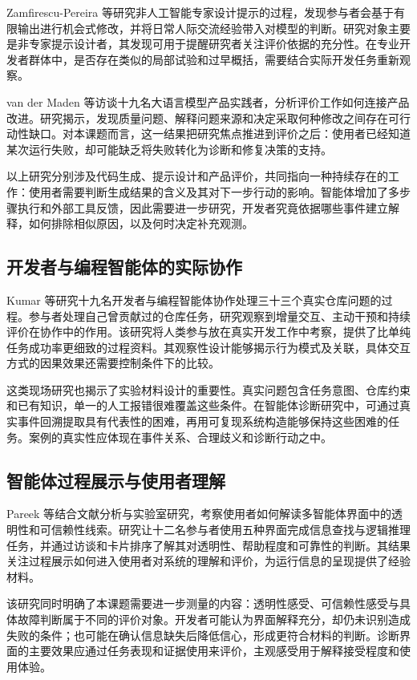 Zamfirescu-Pereira 等\cite{ref65}研究非人工智能专家设计提示的过程，发现参与者会基于有限输出进行机会式修改，并将日常人际交流经验带入对模型的判断。研究对象主要是非专家提示设计者，其发现可用于提醒研究者关注评价依据的充分性。在专业开发者群体中，是否存在类似的局部试验和过早概括，需要结合实际开发任务重新观察。

van der Maden 等\cite{ref01}访谈十九名大语言模型产品实践者，分析评价工作如何连接产品改进。研究揭示，发现质量问题、解释问题来源和决定采取何种修改之间存在可行动性缺口。对本课题而言，这一结果把研究焦点推进到评价之后：使用者已经知道某次运行失败，却可能缺乏将失败转化为诊断和修复决策的支持。

以上研究分别涉及代码生成、提示设计和产品评价，共同指向一种持续存在的工作：使用者需要判断生成结果的含义及其对下一步行动的影响。智能体增加了多步骤执行和外部工具反馈，因此需要进一步研究，开发者究竟依据哪些事件建立解释，如何排除相似原因，以及何时决定补充观测。

\subsection{开发者与编程智能体的实际协作}

Kumar 等\cite{ref59}研究十九名开发者与编程智能体协作处理三十三个真实仓库问题的过程。参与者处理自己曾贡献过的仓库任务，研究观察到增量交互、主动干预和持续评价在协作中的作用。该研究将人类参与放在真实开发工作中考察，提供了比单纯任务成功率更细致的过程资料。其观察性设计能够揭示行为模式及关联，具体交互方式的因果效果还需要控制条件下的比较。

这类现场研究也揭示了实验材料设计的重要性。真实问题包含任务意图、仓库约束和已有知识，单一的人工报错很难覆盖这些条件。在智能体诊断研究中，可通过真实事件回溯提取具有代表性的困难，再用可复现系统构造能够保持这些困难的任务。案例的真实性应体现在事件关系、合理歧义和诊断行动之中。

\subsection{智能体过程展示与使用者理解}

Pareek 等\cite{ref58}结合文献分析与实验室研究，考察使用者如何解读多智能体界面中的透明性和可信赖性线索。研究让十二名参与者使用五种界面完成信息查找与逻辑推理任务，并通过访谈和卡片排序了解其对透明性、帮助程度和可靠性的判断。其结果关注过程展示如何进入使用者对系统的理解和评价，为运行信息的呈现提供了经验材料。

该研究同时明确了本课题需要进一步测量的内容：透明性感受、可信赖性感受与具体故障判断属于不同的评价对象。开发者可能认为界面解释充分，却仍未识别造成失败的条件；也可能在确认信息缺失后降低信心，形成更符合材料的判断。诊断界面的主要效果应通过任务表现和证据使用来评价，主观感受用于解释接受程度和使用体验。

